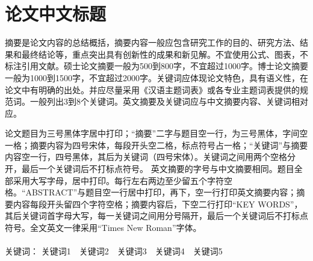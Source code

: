 \documentclass[UTF8,12pt,AutoFakeBold]{ctexart}
\begin{document}
\setcounter{page}{1} %
% 


\setcounter{page}{1} %
\pagestyle{fancy}%
\fancyhf{}
\fancyfoot[C]{\thepage} %


\section*{论文中文标题}
\begin{cnabstract}
    \fontsize{14pt}{17.5pt}\selectfont%
    \par
    摘要是论文内容的总结概括，摘要内容一般应包含研究工作的目的、研究方法、结果和最终结论等，重点突出具有创新性的成果和新见解。不宜使用公式、图表，不标注引用文献。硕士论文摘要一般为500到800字，不宜超过1000字。博士论文摘要一般为1000到1500字，不宜超过2000字。关键词应体现论文特色，具有语义性，在论文中有明确的出处。并应尽量采用《汉语主题词表》或各专业主题词表提供的规范词。一般列出3到8个关键词。英文摘要及关键词应与中文摘要内容、关键词相对应。
    \par
    论文题目为三号黑体字居中打印；“摘要”二字与题目空一行，为三号黑体，字间空一格；摘要内容为四号宋体，每段开头空二格，标点符号占一格；“关键词”与摘要内容空一行，四号黑体，其后为关键词（四号宋体）。关键词之间用两个空格分开，最后一个关键词后不打标点符号。
    英文摘要的字号与中文摘要相同。题目全部采用大写字母，居中打印。每行左右两边至少留五个字符空格。“ABSTRACT”与题目空一行居中打印，再下，空一行打印英文摘要内容；摘要内容每段开头留四个字符空格；摘要内容后，下空二行打印“KEY WORDS”，其后关键词首字母大写，每一关键词之间用分号隔开，最后一个关键词后不打标点符号。全文英文一律采用“Times New Roman”字体。
    \\
    \\
    \heiti 关键词：
    \songti 关键词1\ \ 关键词2\ \ 关键词3\ \ 关键词4\ \ 关键词5
\end{cnabstract}
\pagebreak
\end{document}
